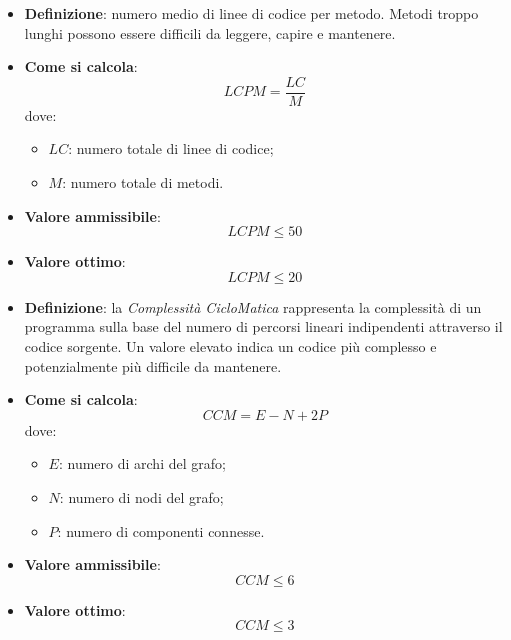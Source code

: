 \begin{itemize}
	\item \textbf{Definizione}: numero medio di linee di codice per metodo. Metodi troppo lunghi possono essere difficili da leggere, capire e mantenere.
	\item \textbf{Come si calcola}: \begin{equation*}LCPM = \frac{LC}{M}\end{equation*} dove:
		\begin{itemize}
			\item $LC$: numero totale di linee di codice;
			\item $M$: numero totale di metodi.
		\end{itemize}
	\item \textbf{Valore ammissibile}: \begin{equation*}LCPM \leq 50\end{equation*}
	\item \textbf{Valore ottimo}: \begin{equation*}LCPM \leq 20\end{equation*}
\end{itemize}

\begin{itemize}
	\item \textbf{Definizione}: la \textit{Complessità CicloMatica} rappresenta la complessità di un programma sulla base del numero di percorsi lineari indipendenti attraverso il codice sorgente. Un valore elevato indica un codice più complesso e potenzialmente più difficile da mantenere.
	\item \textbf{Come si calcola}: \begin{equation*}CCM = E - N + 2P\end{equation*} dove:
		\begin{itemize}
			\item $E$: numero di archi del grafo;
			\item $N$: numero di nodi del grafo;
			\item $P$: numero di componenti connesse.
		\end{itemize}
	\item \textbf{Valore ammissibile}: \begin{equation*}CCM \leq 6\end{equation*}
	\item \textbf{Valore ottimo}: \begin{equation*}CCM \leq 3\end{equation*}
\end{itemize}



